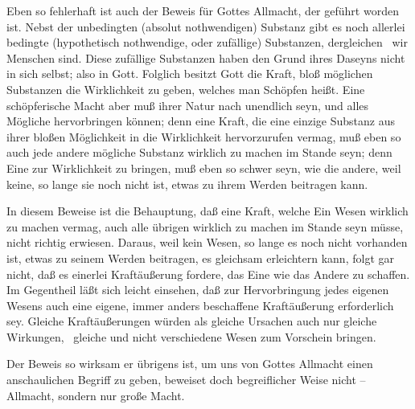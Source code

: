 \begin{RWanm}
Eben so fehlerhaft ist auch der Beweis für Gottes Allmacht, der  geführt worden ist. Nebst der unbedingten (absolut nothwendigen) Substanz gibt es noch allerlei bedingte (hypothetisch nothwendige, oder zufällige) Substanzen, dergleichen \zB\ wir Menschen sind. Diese zufällige Substanzen haben den Grund ihres Daseyns nicht in sich selbst; also in Gott. Folglich besitzt Gott die Kraft, bloß möglichen Substanzen die Wirklichkeit zu geben, welches man Schöpfen heißt. Eine schöpferische Macht aber muß ihrer Natur nach unendlich seyn, und alles Mögliche hervorbringen können; denn eine Kraft, die eine einzige Substanz aus ihrer bloßen Möglichkeit in die Wirklichkeit hervorzurufen vermag, muß eben so auch jede andere mögliche Substanz wirklich zu machen im Stande seyn; denn Eine zur Wirklichkeit zu bringen, muß eben so schwer seyn, wie die andere, weil keine, so lange sie noch nicht ist, etwas zu ihrem Werden beitragen kann.\par
In diesem Beweise ist die Behauptung, daß eine Kraft, welche Ein Wesen wirklich zu machen vermag, auch alle übrigen wirklich zu machen im Stande seyn müsse, nicht richtig erwiesen. Daraus, weil kein Wesen, so lange es noch nicht vorhanden ist, etwas zu seinem Werden beitragen, es gleichsam erleichtern kann, folgt gar nicht, daß es einerlei Kraftäußerung fordere, das Eine wie das Andere zu schaffen. Im Gegentheil läßt sich leicht einsehen, daß zur Hervorbringung jedes eigenen Wesens auch eine eigene, immer anders beschaffene Kraftäußerung erforderlich sey. Gleiche Kraftäußerungen würden als gleiche Ursachen auch nur gleiche Wirkungen, \dh\ gleiche und nicht verschiedene Wesen zum Vorschein bringen.
\end{RWanm}
\begin{RWanm} 
Der Beweis  so wirksam er übrigens ist, um uns von Gottes Allmacht einen anschaulichen Begriff zu geben, beweiset doch begreiflicher Weise nicht -- Allmacht, sondern nur große Macht.
\end{RWanm}



